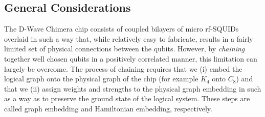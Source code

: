 \documentclass[preprint,12pt,eqsecnum,nofootinbib,amsmath,amssymb]{revtex4}
\begin{document}
\subsection{General Considerations}
The D-Wave Chimera chip consists of coupled bilayers of micro rf-SQUIDs overlaid in such a way 
that, while relatively easy to fabricate, results in a fairly limited set of physical connections between 
the qubits. However, by {\em chaining} together well chosen qubits in a positively correlated manner, 
this limitation can largely be overcome. The process of chaining requires that we (i) embed the 
logical graph onto the physical graph of the chip (for example $K_4$ onto $C_8$) and that we 
(ii) assign weights and strengths to the physical graph embedding in such as a way as to preserve 
the ground state of the logical system. These steps are called graph embedding and Hamiltonian 
embedding, respectively. 
\end{document}

